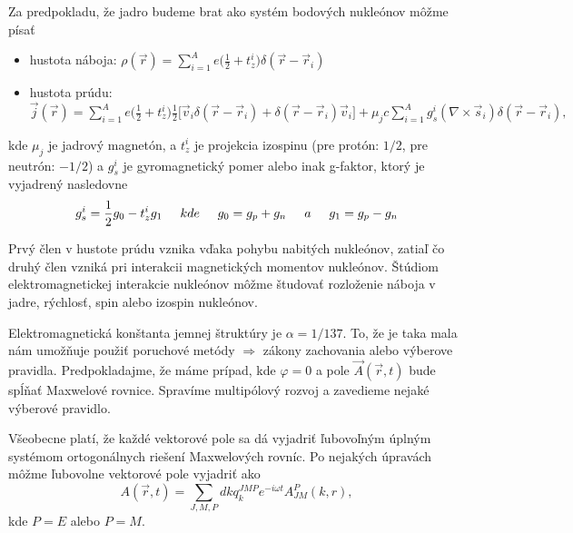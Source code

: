 \documentclass[../../main.tex]{subfiles}
\begin{document}
Za predpokladu, že jadro budeme brat ako systém bodových nukleónov môžme písať 
\begin{itemize}
	\item hustota náboja: $\rho(\vec{r})=\sum_{i=1}^Ae\big( \frac{1}{2}+t_z^i \big)\delta(\vec{r}-\vec{r}_{i})$
	\item hustota prúdu: $\vec{j}(\vec{r})=\sum_{i=1}^Ae\big( \frac{1}{2}+t_z^i \big) \frac{1}{2}\big[\vec{v}_i \delta(\vec{r}-\vec{r}_i) + \delta(\vec{r}-\vec{r}_i)\vec{v}_i \big] + \mu_jc\sum_{i=1}^Ag_s^i(\nabla \times \vec{s}_i) \delta(\vec{r}-\vec{r}_i),$
\end{itemize}
kde $\mu_j$ je jadrový magnetón, a $t_z^i$ je projekcia izospinu (pre protón: $1/2$, pre neutrón: $-1/2$) a $g_s^i$ je gyromagnetický pomer alebo inak g-faktor, ktorý je vyjadrený nasledovne
$$ g_s^i = \frac{1}{2}g_0-t_z^ig_1 \hspace{0.5cm} kde \hspace{0.5cm} g_0=g_p+g_n \hspace{0.5cm} a \hspace{0.5cm} g_1=g_p-g_n $$

Prvý člen v hustote prúdu vznika vďaka pohybu nabitých nukleónov, zatiaľ čo druhý člen vzniká pri interakcii magnetických momentov nukleónov. Štúdiom elektromagnetickej interakcie nukleónov môžme študovať rozloženie náboja v jadre, rýchlosť, spin alebo izospin nukleónov.

Elektromagnetická konštanta jemnej štruktúry je $\alpha=1/137$. To, že je taka mala nám umožňuje použiť poruchové metódy $\Rightarrow$ zákony zachovania alebo výberove pravidla. Predpokladajme, že máme prípad, kde $\varphi=0$ a pole $\vec{A}(\vec{r},t)$ bude spĺňať Maxwelové rovnice. Spravíme multipólový rozvoj a zavedieme nejaké výberové pravidlo.

Všeobecne platí, že každé vektorové pole sa dá vyjadriť ľubovoľným úplným systémom ortogonálnych riešení Maxwelových rovníc. Po nejakých úpravách môžme ľubovolne vektorové pole vyjadriť ako 
\begin{equation}
A(\vec{r},t) = \sum_{J,M,P}dkq_k^{JMP}e^{-i\omega t}A_{JM}^P(k,r), 
\end{equation}
kde $P=E$ alebo $P=M$.
\end{document}
